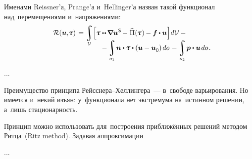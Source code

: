 \begin{otherlanguage}{russian}
\noindent
Именами Reissner’а, Prange’а и~Hellinger’а назван такой функционал над~перемещениями и~напряжениями: %
\begin{multline}\label{reissnerhellingervariationalprinciple}
\shoveleft{\displaystyle \mathcal{R}(\bm{u}, \hspace{-0.32ex}\mathboldtau) \hspace{0.2ex} =
\integral\displaylimits_{\mathcal{V}} \hspace{-0.4ex}
\left[^{\mathstrut} \hspace{-0.2ex}
\mathboldtau \dotdotp \hspace{-0.16ex} \boldnabla {\bm{u}}^{\hspace{0.08ex}\mathsf{S}} \hspace{-0.2ex} - \hspace{0.1ex} \widehat{\Pi}(\hspace{-0.1ex}\mathboldtau\hspace{0.05ex})\hspace{-0.1ex} -
\bm{f} \hspace{-0.1ex} \dotp \bm{u}
\hspace{0.1ex} \right] \hspace{-0.32ex} d\mathcal{V} \hspace{.5ex} - \hfill} \\[-1.2em]
%
\hspace{8em} \displaystyle - \integral\displaylimits_{o_1} \hspace{-0.25ex} \bm{n} \dotp \hspace{-0.1ex} \mathboldtau \dotp \left( \bm{u} - \bm{u}_{\raisemath{-0.1em}{0}} \right) \hspace{-0.1ex} do \hspace{.2ex} -
\integral\displaylimits_{o_2} \hspace{-0.2ex} \bm{p} \dotp \bm{u} \hspace{0.25ex} do \hspace{0.2ex}.
\end{multline}


...


Преимущество принципа Рейсснера\hbox{--}Хеллингера~--- в~свободе варьирования. Но имеется и~некий изъян: у~функционала нет экстремума на~истинном решении, а~лишь стационарность.

Принцип можно использовать для~построения приближённых решений методом Ритца~(Ritz method). Задавая аппроксимации


...



\end{otherlanguage}
